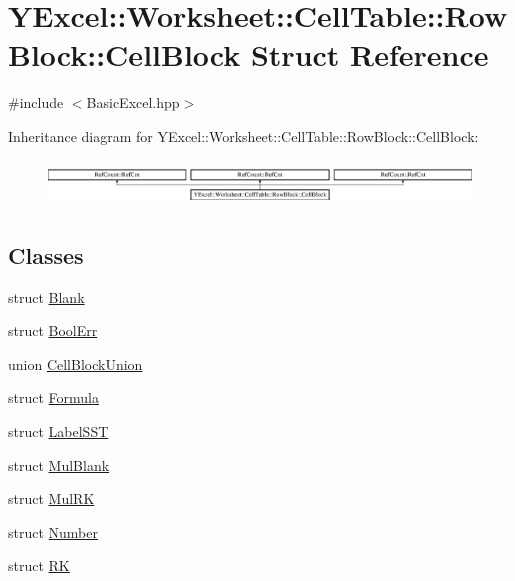 \hypertarget{struct_y_excel_1_1_worksheet_1_1_cell_table_1_1_row_block_1_1_cell_block}{}\section{Y\+Excel\+:\+:Worksheet\+:\+:Cell\+Table\+:\+:Row\+Block\+:\+:Cell\+Block Struct Reference}
\label{struct_y_excel_1_1_worksheet_1_1_cell_table_1_1_row_block_1_1_cell_block}


{\ttfamily \#include $<$Basic\+Excel.\+hpp$>$}

Inheritance diagram for Y\+Excel\+:\+:Worksheet\+:\+:Cell\+Table\+:\+:Row\+Block\+:\+:Cell\+Block\+:\begin{figure}[H]
\begin{center}
\leavevmode
\includegraphics[height=1.228070cm]{struct_y_excel_1_1_worksheet_1_1_cell_table_1_1_row_block_1_1_cell_block}
\end{center}
\end{figure}
\subsection*{Classes}
\begin{DoxyCompactItemize}
\item 
struct \hyperlink{struct_y_excel_1_1_worksheet_1_1_cell_table_1_1_row_block_1_1_cell_block_1_1_blank}{Blank}
\item 
struct \hyperlink{struct_y_excel_1_1_worksheet_1_1_cell_table_1_1_row_block_1_1_cell_block_1_1_bool_err}{Bool\+Err}
\item 
union \hyperlink{union_y_excel_1_1_worksheet_1_1_cell_table_1_1_row_block_1_1_cell_block_1_1_cell_block_union}{Cell\+Block\+Union}
\item 
struct \hyperlink{struct_y_excel_1_1_worksheet_1_1_cell_table_1_1_row_block_1_1_cell_block_1_1_formula}{Formula}
\item 
struct \hyperlink{struct_y_excel_1_1_worksheet_1_1_cell_table_1_1_row_block_1_1_cell_block_1_1_label_s_s_t}{Label\+S\+S\+T}
\item 
struct \hyperlink{struct_y_excel_1_1_worksheet_1_1_cell_table_1_1_row_block_1_1_cell_block_1_1_mul_blank}{Mul\+Blank}
\item 
struct \hyperlink{struct_y_excel_1_1_worksheet_1_1_cell_table_1_1_row_block_1_1_cell_block_1_1_mul_r_k}{Mul\+R\+K}
\item 
struct \hyperlink{struct_y_excel_1_1_worksheet_1_1_cell_table_1_1_row_block_1_1_cell_block_1_1_number}{Number}
\item 
struct \hyperlink{struct_y_excel_1_1_worksheet_1_1_cell_table_1_1_row_block_1_1_cell_block_1_1_r_k}{R\+K}
\end{DoxyCompactItemize}
